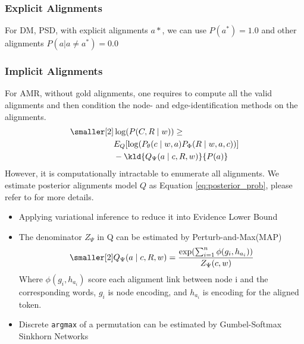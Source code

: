 \subsubsection{Explicit Alignments} For DM, PSD, with explicit
alignments $a*$, we can use $P(a^{*}) = 1.0$ and other
alignments $P(a | a \neq a^{*}) = 0.0 $

\subsubsection{Implicit Alignments} For AMR, without gold alignments,
one requires to compute all the valid alignments and then
condition the node- and edge-identification methods on the alignments.
\begin{equation}
 \label{eq:elbo}
\begin{aligned} \smaller[2]
  & \log(P(C,R \mid w)) \geq \\
  & E_{Q}[\log(P_{\theta}(c\mid w,a) P_{\Phi}(R\mid w,a,c))] \\
  & - \kld{Q_{\Psi}(a\mid c, R,w)}{P(a)}
\end{aligned}
\end{equation}
However, it is computationally intractable to enumerate all
alignments. We estimate posterior alignments model $Q$ as Equation \ref{eq:posterior_prob}, please refer to
\citet{lyu2018amr} for more details.

\begin{itemize}
\item Applying variational inference to reduce it into
  Evidence Lower Bound~\cite[ELBO,][]{kingma2013auto}
\item The denominator $Z_{\Psi}$ in Q can be estimated by Perturb-and-Max(MAP)~\cite{papandreouperturb}
\begin{equation}
  \label{eq:posterior_prob}
\begin{aligned} \smaller[2]
Q_{\Psi}(a\mid c, R,w)= \frac{\exp(\sum_{i=1}^{n} \phi(g_{i}, h_{a_{i}}))} {Z_{\Psi}(c,w)}
\end{aligned}
\end{equation}
Where $\phi(g_{i}, h_{a_{i}})$ score each alignment link between node i and the corresponding words,
$g_{i}$ is node encoding, and $h_{a_{i}}$ is encoding for the aligned token.

\item Discrete \texttt{argmax} of a permutation can be estimated by
  Gumbel-Softmax Sinkhorn Networks \cite{mena2018learning, lyu2018amr}
\end{itemize}

